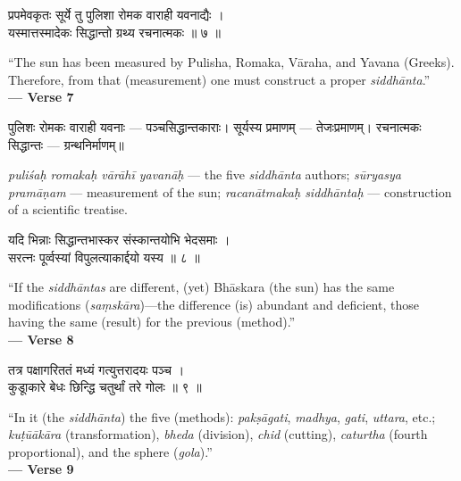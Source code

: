 \documentclass[11pt,a4paper]{article}
\newcommand{\dev}[1]{{\devanagarifont #1}}
\newenvironment{bilingualverse}{%
  \begin{paracol}{2}
  \fontsize{10.5}{13}\selectfont
}{%
  \end{paracol}
  \vspace{0.3cm}
}
\newenvironment{paracol}[1]{\begingroup}{\endgroup}
\newenvironment{leftcolumn*}{\begingroup}{\endgroup}
\newenvironment{rightcolumn}{\begingroup}{\endgroup}
\begin{document}
\begin{bilingualverse}
\begin{leftcolumn*}
\dev{प्रपमेवकृतः सूर्ये तु पुलिशा रोमक वाराही यवनाद्यैः ।}\\
\dev{यस्मात्तस्मादेकः सिद्धान्तो ग्रथ्य रचनात्मकः ॥ ७ ॥}
\end{leftcolumn*}
\begin{rightcolumn}
``The sun has been measured by Pulisha, Romaka, Vāraha, and Yavana (Greeks). Therefore, from that (measurement) one must construct a proper \textit{siddhānta}.''\\[0.3cm]
\hfill\textbf{— Verse 7}
\end{rightcolumn}
\end{bilingualverse}

\begin{paracol}{2}
\begin{leftcolumn*}
\dev{पुलिशः रोमकः वाराही यवनाः} — पञ्चसिद्धान्तकाराः। \dev{सूर्यस्य प्रमाणम्} — तेजःप्रमाणम्। \dev{रचनात्मकः सिद्धान्तः} — ग्रन्थनिर्माणम्॥
\end{leftcolumn*}
\begin{rightcolumn}
\textit{puliśaḥ romakaḥ vārāhī yavanāḥ} --- the five \textit{siddhānta} authors; \textit{sūryasya pramāṇam} --- measurement of the sun; \textit{racanātmakaḥ siddhāntaḥ} --- construction of a scientific treatise.
\end{rightcolumn}
\end{paracol}

\vspace{0.3cm}

\begin{bilingualverse}
\begin{leftcolumn*}
\dev{यदि भिन्नाः सिद्धान्तभास्कर संस्कान्तयोभि भेदसमाः ।}\\
\dev{सरत्नः पूर्व्वस्यां विपुलत्याकार्द्दयो यस्य ॥ ८ ॥}
\end{leftcolumn*}
\begin{rightcolumn}
``If the \textit{siddhāntas} are different, (yet) Bhāskara (the sun) has the same modifications (\textit{saṃskāra})---the difference (is) abundant and deficient, those having the same (result) for the previous (method).''\\[0.3cm]
\hfill\textbf{— Verse 8}
\end{rightcolumn}
\end{bilingualverse}

\begin{bilingualverse}
\begin{leftcolumn*}
\dev{तत्र पक्षागरिततं मध्यं गत्युत्तरादयः पञ्च ।}\\
\dev{कुडूाकारे बेधः छिन्द्धि चतुर्थां तरे गोलः ॥ ९ ॥}
\end{leftcolumn*}
\begin{rightcolumn}
``In it (the \textit{siddhānta}) the five (methods): \textit{pakṣāgati}, \textit{madhya}, \textit{gati}, \textit{uttara}, etc.; \textit{kuṭūākāra} (transformation), \textit{bheda} (division), \textit{chid} (cutting), \textit{caturtha} (fourth proportional), and the sphere (\textit{gola}).''\\[0.3cm]
\hfill\textbf{— Verse 9}
\end{rightcolumn}
\end{bilingualverse}
\end{document}

